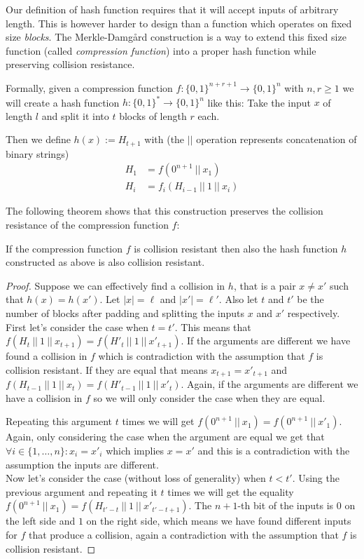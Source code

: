 Our definition of hash function requires that it will accept inputs of arbitrary length.
This is however harder to design than a function which operates on fixed size \emph{blocks}.
The Merkle-Damg\aa rd construction is a way to extend this fixed size function (called \emph{compression function}) into a proper hash function while preserving collision resistance.

Formally, given a compression function $f: \{0,1\}^{n+r+1} \to \{0,1\}^n$ with $n,r \ge 1$ we will create a hash function $h: \{0,1\}^* \to \{0,1\}^n$ like this: Take the input $x$ of length $l$ and split it into $t$ blocks of length $r$ each.

Then we define $h(x) := H_{t+1}$ with (the $||$ operation represents concatenation of binary strings)
\begin{align*}
H_1 &= f(0^{n+1} ~||~ x_1) \\
H_i &= f_i(H_{i-1} ~||~ 1 ~||~ x_i)
\end{align*}

The following theorem shows that this construction preserves the collision resistance of the compression function $f$:

\begin{theorem}
If the compression function $f$ is collision resistant then also the hash function $h$ constructed as above is also collision resistant.
\end{theorem}
\begin{proof}
Suppose we can effectively find a collision in $h$, that is a pair $x \neq x'$ such that $h(x) = h(x')$.
Let $|x| = \ell$ and $|x'| = \ell'$.
Also let $t$ and $t'$ be the number of blocks after padding and splitting the inputs $x$ and $x'$ respectively.
\\

First let's consider the case when $t = t'$.
This means that $f(H_t ~||~ 1 ~||~ x_{t+1}) = f(H'_t ~||~ 1 ~||~ x'_{t+1})$. 
If the arguments are different we have found a collision in $f$ which is contradiction with the assumption that $f$ is collision resistant.
If they are equal that means $x_{t+1} = x'_{t+1}$ and $f(H_{t-1} ~||~ 1 ~||~ x_t) = f(H'_{t-1} ~||~ 1 ~||~ x'_t)$.
Again, if the arguments are different we have a collision in $f$ so we will only consider the case when they are equal.

Repeating this argument $t$ times we will get $f(0^{n+1} ~||~ x_1) = f(0^{n+1} ~||~ x'_1)$.
Again, only considering the case when the argument are equal we get that $\forall i \in \{1,\ldots,n\}: x_i = x'_i$ which implies $x = x'$ and this is a contradiction with the assumption the inputs are different.
\\

Now let's consider the case (without loss of generality) when $t < t'$.
Using the previous argument and repeating it $t$ times we will get the equality $f(0^{n+1} ~||~ x_1) = f(H_{t'-t} ~||~ 1 ~||~ x'_{t'-t+1})$.
The $n+1$-th bit of the inputs is $0$ on the left side and $1$ on the right side, which means we have found different inputs for $f$ that produce a collision, again a contradiction with the assumption that $f$ is collision resistant. 
\end{proof}

